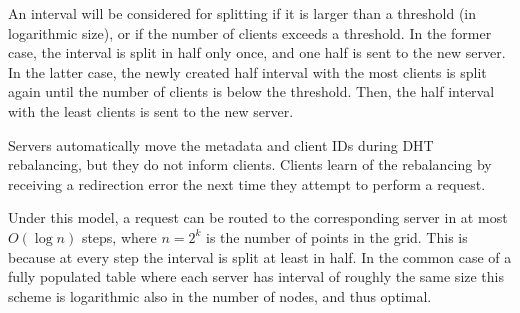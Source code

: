 An interval will be considered for splitting if it is larger than a threshold (in logarithmic size), or if the number of clients exceeds a threshold.
In the former case, the interval is split in half only once, and one half is sent to the new server.
In the latter case, the newly created half interval with the most clients is split again until the number of clients is below the threshold.
Then, the half interval with the least clients is sent to the new server.

Servers automatically move the metadata and client IDs during DHT rebalancing, but they do not inform clients.
Clients learn of the rebalancing by receiving a redirection error the next time they attempt to perform a request.

Under this model, a request can be routed to the corresponding server in at most $O(\log n)$ steps, where $n = 2^k$ is the number of points in the grid.
This is because at every step the interval is split at least in half.
In the common case of a fully populated table where each server has interval of roughly the same size this scheme is logarithmic also in the number of nodes, and thus optimal.
